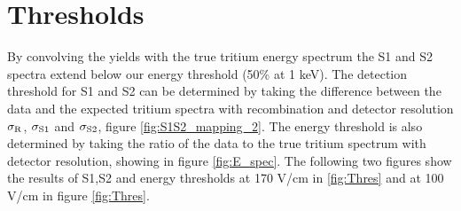 \section{Thresholds}

By convolving the yields with the true tritium energy spectrum the S1 and S2 spectra extend below our energy threshold (50\% at 1 keV). The detection threshold for S1 and S2 can be determined by taking the difference between the data and the expected tritium spectra with recombination and detector resolution $\rm \sigma_R$, $\rm \sigma_{S1}$ and $\rm \sigma_{S2}$, figure \ref{fig:S1S2_mapping_2}. The energy threshold is also determined by taking the ratio of the data to the true tritium spectrum with detector resolution, showing in figure \ref{fig:E_spec}. The following two figures show the results of S1,S2 and energy thresholds at 170 V/cm in \ref{fig:Thres} and at 100 V/cm in figure \ref{fig:Thres}.

